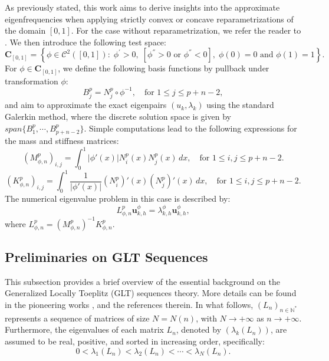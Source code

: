 \documentclass[11pt]{article}
\begin{document}
As previously stated, this work aims to derive insights into the approximate eigenfrequencies when applying strictly convex or concave reparametrizations of the domain $[0,1]$. For the case without reparametrization, we refer the reader to \cite{ekstrom2018eigenvalues}. We then introduce the following test space:
\begin{equation}\label{eq:reparametrization-space}
\mathbf{C}_{[0,1]}=\left\{ \phi \in \mathcal{C}^2([0,1]):\; \phi^{'} > 0,\;[\phi^{''} > 0 \text{ or }\phi^{''} < 0],\; \phi(0) = 0 \text{ and } \phi(1) = 1 \right\}.
\end{equation}
For $\phi \in \mathbf{C}_{[0,1]} $, we define the following basis functions by pullback under transformation $\phi$:
$$
B_j^p = N_j^p \circ \phi^{-1}, \quad \text{for } 1 \leq j \leq p+n-2,
$$
and aim to approximate the exact eigenpairs $(u_k, \lambda_k)$ using the standard Galerkin method, where the discrete solution space is given by $span \{B_1^p, \cdots, B_{p+n-2}^p \}$. Simple computations lead to the following expressions for the mass and stiffness matrices:
\begin{equation}\label{eq:mass-matrix-dif}
(M_{\phi, n}^p)_{i,j}= \int_0^1 \left| \phi'(x) \right| N_i^p(x) N_j^p(x) \, dx, \quad \text{for } 1 \leq i,j \leq p+n-2.
\end{equation}
\begin{equation}\label{eq:stiffness-matrix-dif}
(K_{\phi,n}^p)_{i,j} = \int_0^1 \frac{1}{\left| \phi'(x) \right|} (N_i^p)'(x) (N_j^p)'(x) \, dx, \quad \text{for } 1 \leq i,j \leq p+n-2.
\end{equation}
The numerical eigenvalue problem in this case is described by:
\begin{equation*}
L_{\phi,n}^p \mathbf{u}_{k,h}^{\phi} = \lambda_{k,h}^{\phi} \mathbf{u}_{k,h}^{\phi},
\end{equation*}
where $L_{\phi,n}^p=\left( M_{\phi,n}^p\right)^{-1} K_{\phi,n}^p.$





\subsection{Preliminaries on GLT Sequences}\label{sec:preliminariesGLT}

This subsection provides a brief overview of the essential background on the Generalized Locally Toeplitz (GLT) sequences theory. More details can be found in the pioneering works \cite{bianchi2021analysis,garoni2017generalized}, and the references therein.  
In what follows, $(L_{n})_{n\in\mathbb{N}^{*}}$ represents a sequence of matrices of  size  $N=N(n)$, with $N \rightarrow +\infty$  as $n \rightarrow +\infty$. Furthermore, the eigenvalues of each matrix $L_n$, denoted by  $(\lambda_k(L_n))$, are assumed to be real, positive, and sorted in increasing order, specifically:  
$$0<\lambda_1(L_n)<\lambda_2(L_n)<\cdots<\lambda_N(L_n).$$  
\end{document}
